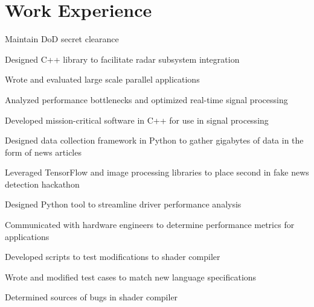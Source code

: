 \documentclass[]{deedy-resume-openfont}
\begin{document}
\vspace{-1mm}

\section{\hfill Work Experience \hfill}
\vspace{-1.35mm}
\begin{tightemize}
\vspace{\topsep} %
\item Maintain DoD secret clearance
\item Designed C++ library to facilitate radar subsystem integration
\item Wrote and evaluated large scale parallel applications
\item Analyzed performance bottlenecks and optimized real-time signal processing
\item Developed mission-critical software in C++ for use in signal processing
\item Designed data collection framework in Python to gather gigabytes of data in the form of news articles
\item Leveraged TensorFlow and image processing libraries to place second in fake news detection hackathon
\end{tightemize}

\vspace{2mm}
\vspace{0.65mm}
\vspace{1.2mm}
\begin{tightemize}
\item Designed Python tool to streamline driver performance analysis
\item Communicated with hardware engineers to determine performance metrics for applications
\item Developed scripts to test modifications to shader compiler
\item Wrote and modified test cases to match new language specifications
\item Determined sources of bugs in shader compiler
\end{tightemize}
\end{document}
